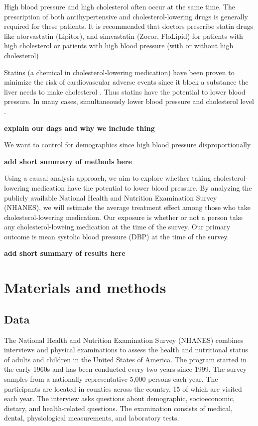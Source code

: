 \documentclass[useAMS,usenatbib,referee]{biom}
\begin{document}
High blood pressure and high cholesterol often occur at the same time.
The prescription of both antihypertensive and cholesterol-lowering drugs
is generally required for these patients. It is recommended that doctors
prescribe statin drugs like atorvastatin (Lipitor), and simvastatin
(Zocor, FloLipid) for patients with high cholesterol or patients with
high blood pressure (with or without high cholesterol)
\citep{williams_facing_2020}. \citep{egan_blood_2013}

Statins (a chemical in cholesterol-lowering medication) have been proven
to minimize the risk of cardiovascular adverse events since it block a
substance the liver needs to make cholesterol \citep{liu_statins_2023}.
Thus statins have the potential to lower blood pressure. In many cases,
simultaneously lower blood pressure and cholesterol level
\citep{strazzullo_statins_2007}.

\textbf{explain our dags and why we include thing}

We want to control for demographics since high blood pressure
disproportionally

\textbf{add short summary of methods here}

Using a causal analysis approach, we aim to explore whether taking
cholesterol-lowering medication have the potential to lower blood
pressure. By analyzing the publicly available National Health and
Nutrition Examination Survey (NHANES), we will estimate the average
treatment effect among those who take cholesterol-lowering medication.
Our exposure is whether or not a person take any cholesterol-loweing
medication at the time of the survey. Our primary outcome is mean
systolic blood pressure (DBP) at the time of the survey.

\textbf{add short summary of results here}

\hypertarget{methods}{%
\section{Materials and methods}\label{methods}}

\hypertarget{data}{%
\subsection{Data}\label{data}}

The National Health and Nutrition Examination Survey (NHANES) combines
interviews and physical examinations to assess the health and
nutritional status of adults and children in the United States of
America. The program started in the early 1960s and has been conducted
every two years since 1999. The survey samples from a nationally
representative 5,000 persons each year. The participants are located in
counties across the country, 15 of which are visited each year. The
interview asks questions about demographic, socioeconomic, dietary, and
health-related questions. The examination consists of medical, dental,
physiological measurements, and laboratory tests.
\end{document}
